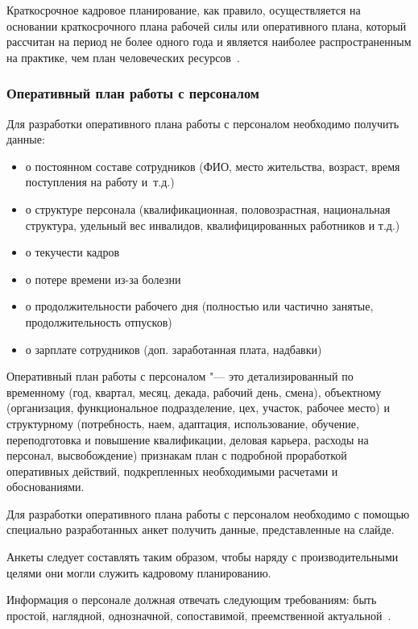 \documentclass{../industrial-development}
\begin{document}
\lecturenotes

\alert{Краткосрочное кадровое планирование}, как правило, осуществляется на основании краткосрочного плана рабочей силы или оперативного плана, который рассчитан на период не более одного года и является наиболее распространенным на практике, чем
план человеческих ресурсов~\cite[с.~87]{Ivanova}.

\begin{frame} \frametitle{Оперативный план работы с персоналом}
Для разработки оперативного плана работы с персоналом необходимо получить данные:
  \begin{itemize}
	\item	о постоянном составе сотрудников (ФИО, место жительства, возраст, время поступления на работу и~т.д.)
	\item	о структуре персонала (квалификационная, половозрастная, национальная структура, удельный вес инвалидов, квалифицированных работников и т.д.)
	\item	о текучести кадров
	\item	о потере времени из-за болезни
	\item	о продолжительности рабочего дня (полностью или частично занятые, продолжительность отпусков)
	\item	о зарплате сотрудников (доп. заработанная плата, надбавки)

	  \end{itemize}

\end{frame}

\lecturenotes

\alert{Оперативный план работы с персоналом} "--- это детализированный по временному (год, квартал, месяц, декада, рабочий день, смена), объектному (организация, функциональное подразделение, цех, участок, рабочее место) и структурному (потребность, наем, адаптация, использование, обучение, переподготовка и повышение квалификации, деловая карьера, расходы на персонал, высвобождение) признакам план с подробной проработкой оперативных действий, подкрепленных необходимыми расчетами и обоснованиями.

Для разработки оперативного плана работы с персоналом необходимо с помощью специально разработанных анкет получить данные, представленные на слайде.

Анкеты следует составлять таким образом, чтобы наряду с производительными целями они могли служить кадровому планированию.

Информация о персонале должная отвечать следующим требованиям:
быть простой, наглядной, однозначной, сопоставимой, преемственной 
актуальной~\cite[с.~87--88]{Ivanova}.
\end{document}
